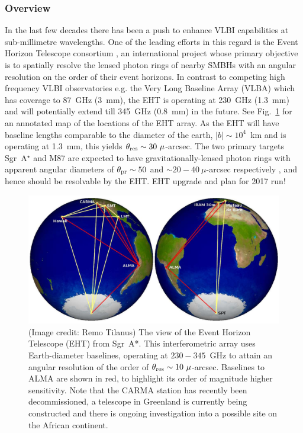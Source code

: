 {\subsubsection{Overview}
In the last few decades there has been a push to enhance VLBI capabilities at sub-millimetre wavelengths. One of the leading efforts in this regard is the Event Horizon Telescope consortium \citep[(EHT),][]{Doeleman_2010}, an international project whose primary objective is to spatially resolve the lensed photon rings of nearby SMBHs with an angular resolution on the order of their event horizons. In contrast to competing high frequency VLBI observatories e.g. the Very Long Baseline Array (VLBA) which has coverage to 87~GHz (3~mm), the EHT is operating at 230~GHz (1.3~mm) and will potentially extend till 345~GHz (0.8~mm) in the future. See Fig.~\ref{fig:eht_globe} for an annotated map of the locations of the EHT array. As the EHT will have baseline lengths comparable to the diameter of the earth, $|b| \sim 10^4$~km and is operating at 1.3~mm, this yields $\theta_{\rm res} \sim 30\ \mu$-arcsec.  The two primary targets Sgr~A$^\star$ and M87 are expected to have gravitationally-lensed photon rings with apparent angular diameters of $\theta_{\rm pr} \sim 50$ and $\sim 20-40\ \mu$-arcsec respectively \citep*{Broderick_2009,Falcke_2013}, and hence should be resolvable by the EHT. 
EHT upgrade and plan for 2017 run!
\begin{figure}[h!]
\includegraphics[width=0.8\columnwidth]{Images/eht_globe}
\caption{(Image credit: Remo Tilanus) The view of the Event Horizon Telescope (EHT) from Sgr~A*. This interferometric array uses Earth-diameter baselines, operating at $230-345$~GHz to attain an angular resolution of the order of ${\theta_{\rm res} \sim 10\ \mu}$-arcsec. Baselines to ALMA are shown in red, to highlight its order of magnitude higher sensitivity. Note that the CARMA station has recently been decommissioned, a telescope in Greenland is currently being constructed and there is ongoing investigation into a possible site on the African continent.\label{fig:eht_globe}%
}
\end{figure}



}
